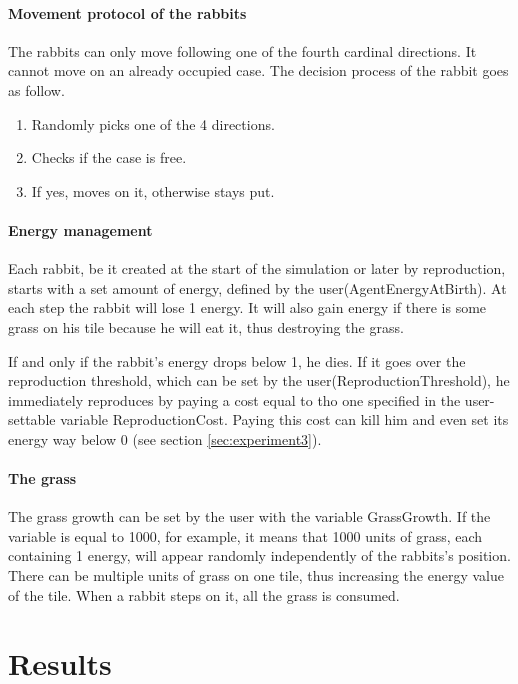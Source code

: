 \documentclass[11pt]{article}
\begin{document}
\paragraph{Movement protocol of the rabbits} The rabbits can only move following one of the fourth cardinal directions. It cannot move on an already occupied case. The decision process of the rabbit goes as follow.

\begin{enumerate}
  \item Randomly picks one of the 4 directions.
  \item Checks if the case is free.
  \item If yes, moves on it, otherwise stays put.
\end{enumerate}

\paragraph{Energy management} Each rabbit, be it created at the start of the simulation or later by reproduction, starts with a set amount of energy, defined by the user(AgentEnergyAtBirth). At each step the rabbit will lose 1 energy. It will also gain energy if there is some grass on his tile because he will eat it, thus destroying the grass.

If and only if the rabbit's energy drops below 1, he dies. If it goes over the reproduction threshold, which can be set by the user(ReproductionThreshold), he immediately reproduces by paying a cost equal to tho one specified in the user-settable variable ReproductionCost. Paying this cost can kill him and even set its energy way below 0 (see section \ref{sec:experiment3}).

\paragraph{The grass} The grass growth can be set by the user with the variable GrassGrowth. If the variable is equal to 1000, for example, it means that 1000 units of grass, each containing 1 energy, will appear randomly independently of the rabbits's position. There can be multiple units of grass on one tile, thus increasing the energy value of the tile. When a rabbit steps on it, all the grass is consumed.

\section{Results}
\end{document}

